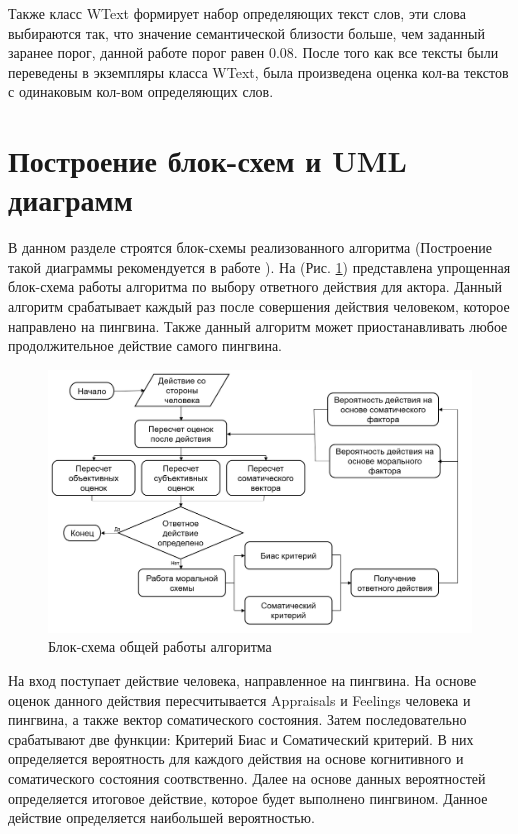 Также класс WText формирует набор определяющих текст слов, эти слова выбираются так, что значение 
семантической близости больше, чем заданный заранее порог, данной работе порог равен 0.08. После 
того как все тексты были переведены в экземпляры класса WText, была произведена оценка кол-ва 
текстов с одинаковым кол-вом определяющих слов.

\section{Построение блок-схем и UML диаграмм}

В данном разделе строятся блок-схемы реализованного алгоритма (Построение такой диаграммы рекомендуется в работе \cite{OOP}).
На (Рис. \ref{pic:oldcmodel0}) представлена упрощенная блок-схема работы алгоритма по выбору ответного действия для актора.
Данный алгоритм срабатывает каждый раз после совершения действия человеком, которое направлено на пингвина.
Также данный алгоритм может приостанавливать любое продолжительное действие самого пингвина. 

\begin{figure}[h]
\includegraphics[width=0.75\columnwidth]{./img/oldcmodel0.png}
\centering
\caption{Блок-схема общей работы алгоритма}
\label{pic:oldcmodel0}
\end{figure}

На вход поступает действие человека, направленное на пингвина. На основе оценок данного действия пересчитывается Appraisals и Feelings человека и пингвина, а также 
вектор соматического состояния. Затем последовательно срабатывают две функции: Критерий Биас и Соматический критерий. 
В них определяется вероятность для каждого действия на основе когнитивного и соматического состояния соотвственно.
Далее на основе данных вероятностей определяется итоговое действие, которое будет выполнено пингвином. 
Данное действие определяется наибольшей вероятностью. 

